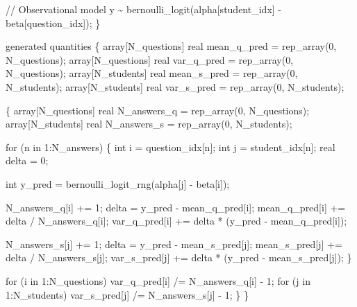 \documentclass[
  letterpaper,
  DIV=11,
  numbers=noendperiod]{scrartcl}
\newenvironment{Shaded}{\begin{snugshade}}{\end{snugshade}}
\newcommand{\CommentTok}[1]{\textcolor[rgb]{0.37,0.37,0.37}{#1}}
\newcommand{\ControlFlowTok}[1]{\textcolor[rgb]{0.00,0.23,0.31}{#1}}
\newcommand{\DataTypeTok}[1]{\textcolor[rgb]{0.68,0.00,0.00}{#1}}
\newcommand{\DecValTok}[1]{\textcolor[rgb]{0.68,0.00,0.00}{#1}}
\newcommand{\KeywordTok}[1]{\textcolor[rgb]{0.00,0.23,0.31}{#1}}
\newcommand{\NormalTok}[1]{\textcolor[rgb]{0.00,0.23,0.31}{#1}}
\begin{document}
\begin{codelisting}
\begin{Shaded}
\begin{Highlighting}[]
  \CommentTok{// Observational model}
\NormalTok{  y \textasciitilde{} bernoulli\_logit(alpha[student\_idx] {-} beta[question\_idx]);}
\NormalTok{\}}

\KeywordTok{generated quantities}\NormalTok{ \{}
  \DataTypeTok{array}\NormalTok{[N\_questions] }\DataTypeTok{real}\NormalTok{ mean\_q\_pred = rep\_array(}\DecValTok{0}\NormalTok{, N\_questions);}
  \DataTypeTok{array}\NormalTok{[N\_questions] }\DataTypeTok{real}\NormalTok{ var\_q\_pred  = rep\_array(}\DecValTok{0}\NormalTok{, N\_questions);}
  \DataTypeTok{array}\NormalTok{[N\_students]  }\DataTypeTok{real}\NormalTok{ mean\_s\_pred = rep\_array(}\DecValTok{0}\NormalTok{, N\_students);}
  \DataTypeTok{array}\NormalTok{[N\_students]  }\DataTypeTok{real}\NormalTok{ var\_s\_pred  = rep\_array(}\DecValTok{0}\NormalTok{, N\_students);}

\NormalTok{  \{}
    \DataTypeTok{array}\NormalTok{[N\_questions] }\DataTypeTok{real}\NormalTok{ N\_answers\_q = rep\_array(}\DecValTok{0}\NormalTok{, N\_questions);}
    \DataTypeTok{array}\NormalTok{[N\_students]  }\DataTypeTok{real}\NormalTok{ N\_answers\_s = rep\_array(}\DecValTok{0}\NormalTok{, N\_students);}

    \ControlFlowTok{for}\NormalTok{ (n }\ControlFlowTok{in} \DecValTok{1}\NormalTok{:N\_answers) \{}
      \DataTypeTok{int}\NormalTok{ i = question\_idx[n];}
      \DataTypeTok{int}\NormalTok{ j = student\_idx[n];}
      \DataTypeTok{real}\NormalTok{ delta = }\DecValTok{0}\NormalTok{;}

      \DataTypeTok{int}\NormalTok{ y\_pred = bernoulli\_logit\_rng(alpha[j] {-} beta[i]);}

\NormalTok{      N\_answers\_q[i] += }\DecValTok{1}\NormalTok{;}
\NormalTok{      delta = y\_pred {-} mean\_q\_pred[i];}
\NormalTok{      mean\_q\_pred[i] += delta / N\_answers\_q[i];}
\NormalTok{      var\_q\_pred[i] += delta * (y\_pred {-} mean\_q\_pred[i]);}

\NormalTok{      N\_answers\_s[j] += }\DecValTok{1}\NormalTok{;}
\NormalTok{      delta = y\_pred {-} mean\_s\_pred[j];}
\NormalTok{      mean\_s\_pred[j] += delta / N\_answers\_s[j];}
\NormalTok{      var\_s\_pred[j] += delta * (y\_pred {-} mean\_s\_pred[j]);}
\NormalTok{    \}}

    \ControlFlowTok{for}\NormalTok{ (i }\ControlFlowTok{in} \DecValTok{1}\NormalTok{:N\_questions)}
\NormalTok{      var\_q\_pred[i] /= N\_answers\_q[i] {-} }\DecValTok{1}\NormalTok{;}
    \ControlFlowTok{for}\NormalTok{ (j }\ControlFlowTok{in} \DecValTok{1}\NormalTok{:N\_students)}
\NormalTok{      var\_s\_pred[j] /= N\_answers\_s[j] {-} }\DecValTok{1}\NormalTok{;}
\NormalTok{  \}}
\NormalTok{\}}
\end{Highlighting}
\end{Shaded}

\end{codelisting}
\end{document}
